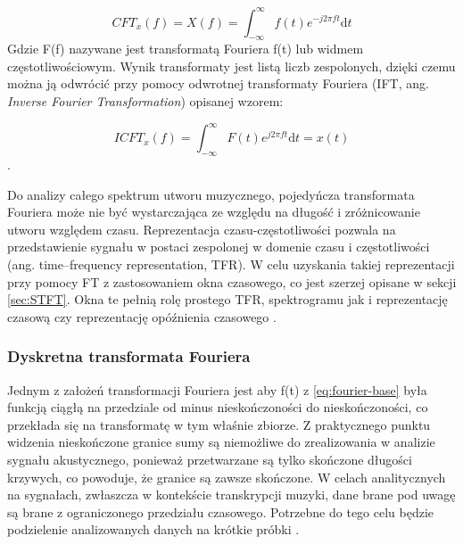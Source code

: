 \documentclass[12pt,a4paper,twoside]{mwart}
\begin{document}
\begin{equation} \label{eq:fourier-base}
CFT_x(f) = X(f) = \int_{-\infty}^{\infty}\textit{f}(t)e^ {-j2\pi ft}\mathrm{d}t
\end{equation}
Gdzie F(f) nazywane jest transformatą Fouriera f(t) lub widmem częstotliwościowym. Wynik transformaty jest listą liczb zespolonych, dzięki czemu można ją odwrócić przy pomocy odwrotnej transformaty Fouriera (IFT, ang. \textit{Inverse Fourier Transformation}) opisanej wzorem:

\begin{equation} \label{eq:inverse:fourier-base}
ICFT_x(f) = \int_{-\infty}^{\infty}\textit{F}(t)e^ {j2\pi ft}\mathrm{d}t = x(t)
\end{equation}
\cite{TransformacjaFourieraWroc}\cite{TransformacjaFourieraAgh}\cite[22-25]{Transcription:Anssi:SignalProcessingMethods}.

Do analizy całego spektrum utworu muzycznego, pojedyńcza transformata Fouriera może nie być wystarczająca ze względu na długość i zróżnicowanie utworu względem czasu. Reprezentacja czasu-częstotliwości pozwala na przedstawienie sygnału w postaci zespolonej w domenie czasu i częstotliwości (ang. time–frequency representation, TFR). W celu uzyskania takiej reprezentacji przy pomocy FT z zastosowaniem okna czasowego, co jest szerzej opisane w sekcji \ref{sec:STFT}. Okna te pełnią rolę prostego TFR, spektrogramu jak i reprezentację czasową czy reprezentację opóźnienia czasowego \cite[21-22]{Transcription:Anssi:SignalProcessingMethods}.

\subsubsection{Dyskretna transformata Fouriera} \label{sec:DFT}
Jednym z założeń transformacji Fouriera jest aby f(t) z \ref{eq:fourier-base} była funkcją ciągłą na przedziale od minus nieskończoności do nieskończoności, co przekłada się na transformatę w tym właśnie zbiorze. Z praktycznego punktu widzenia nieskończone granice sumy są niemożliwe do zrealizowania w analizie sygnału akustycznego, ponieważ przetwarzane są tylko skończone długości krzywych, co powoduje, że granice są zawsze skończone. W celach analitycznych na sygnałach, zwłaszcza w kontekście transkrypcji muzyki, dane brane pod uwagę są brane z ograniczonego przedziału czasowego. Potrzebne do tego celu będzie podzielenie analizowanych danych na krótkie próbki \cite{TransformacjaFourieraWroc}\cite{TransformacjaFourieraelektronikab2b}.
\end{document}
